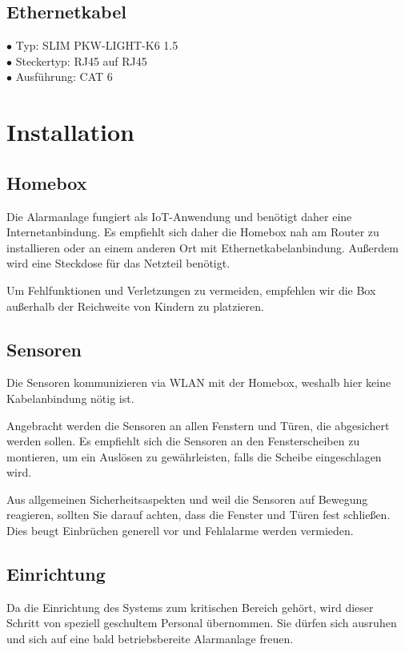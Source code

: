 \documentclass[a4paper,12pt]{article}
\begin{document}
	\subsection{Ethernetkabel}
	$\bullet$ Typ:   SLIM PKW-LIGHT-K6 1.5\\ 
	$\bullet$ Steckertyp: RJ45 auf RJ45\\ 
	$\bullet$ Ausführung: CAT 6
	
\newpage

\section{Installation}
\subsection{Homebox}
Die Alarmanlage fungiert als IoT-Anwendung und benötigt daher eine Internetanbindung. Es empfiehlt sich daher die Homebox nah am Router zu installieren oder an einem anderen Ort mit Ethernetkabelanbindung. Außerdem wird eine Steckdose für das Netzteil benötigt.\par
Um Fehlfunktionen und Verletzungen zu vermeiden, empfehlen wir die Box außerhalb der Reichweite von Kindern zu platzieren.

\subsection{Sensoren}
Die Sensoren kommunizieren via WLAN mit der Homebox, weshalb hier keine Kabelanbindung nötig ist.\par
Angebracht werden die Sensoren an allen Fenstern und Türen, die abgesichert werden sollen. Es empfiehlt sich die Sensoren an den Fensterscheiben zu montieren, um ein Auslösen zu gewährleisten, falls die Scheibe eingeschlagen wird.\par
Aus allgemeinen Sicherheitsaspekten und weil die Sensoren auf Bewegung reagieren, sollten Sie darauf achten, dass die Fenster und Türen fest schließen. Dies beugt Einbrüchen generell vor und Fehlalarme werden vermieden.

\subsection{Einrichtung}
Da die Einrichtung des Systems zum kritischen Bereich gehört, wird dieser Schritt von speziell geschultem Personal übernommen. Sie dürfen sich ausruhen und sich auf eine bald betriebsbereite Alarmanlage freuen.
\end{document}
